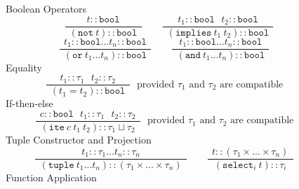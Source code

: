 \documentclass[11pt,twoside,fleqn,openright,titlepage]{cslreport}
\begin{document}
\begin{figure}
\begin{center}
Boolean Operators\\[1ex]
\begin{displaymath}
\hspace{3em}
\frac{~~t::\mathtt{bool}~~}{~~(\mathtt{not}\ t)::\mathtt{bool}~~}
\hspace{2em}
\frac{~~t_1::\mathtt{bool}~~~t_2::\mathtt{bool}~~}{~~(\mathtt{implies}\ t_1\ t_2)::\mathtt{bool}~~}
\end{displaymath}
\begin{displaymath}
\hspace{2em}
\frac{~~t_1::\mathtt{bool}\ldots t_n::\mathtt{bool}~~}{~~(\mathtt{or}\ t_1\ldots t_n)::\mathtt{bool}~~}
\hspace{2em}
\frac{~~t_1::\mathtt{bool}\ldots t_n::\mathtt{bool}~~}{~~(\mathtt{and}\ t_1\ldots t_n)::\mathtt{bool}~~}
\end{displaymath}
\vspace*{2ex}
Equality\\[1ex]
\begin{displaymath}
\hspace{2em}
\frac{~~t_1::\tau_1~~~t_2::\tau_2~~}{~~(t_1 = t_2)::\mathtt{bool}~~}\mbox{~~provided $\tau_1$ and $\tau_2$ are compatible}
\end{displaymath}
\vspace*{2ex}
If-then-else\\[1ex]
\begin{displaymath}
\hspace{2em}
\frac{~~c::\mathtt{bool}~~~t_1::\tau_1~~~t_2::\tau_2~~}{~~(\mathtt{ite}\ c\ t_1\ t_2)::\tau_1\sqcup\tau_2~~}
\mbox{~~provided $\tau_1$ and $\tau_2$ are compatible}
\end{displaymath}
\vspace*{2ex}
Tuple Constructor and Projection\\[1ex]
\begin{displaymath}
\hspace{2em}
\frac{~~t_1::\tau_1 \ldots t_n::\tau_n~~}{~~(\mathtt{tuple}\ t_1\ldots t_n)::(\tau_1\times\ldots\times\tau_n)~~}
\hspace{2em}
\frac{~~t::(\tau_1\times\ldots\times\tau_n)~~}{~~(\mathtt{select}_i\ t)::\tau_i~~}
\end{displaymath}
\vspace*{2ex}
Function Application\\[1ex]
\begin{displaymath}
\hspace{2em}

\end{displaymath}
\end{center}
\end{figure}
\end{document}

